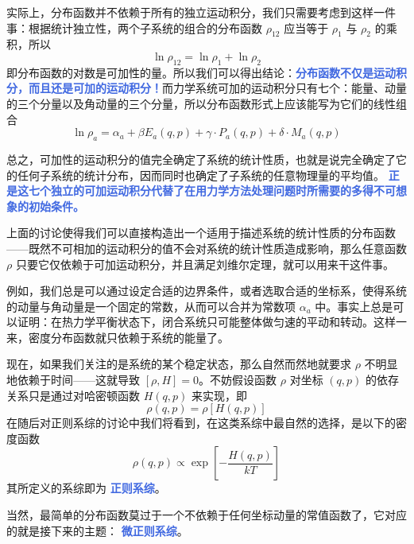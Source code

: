 实际上，分布函数并不依赖于所有的独立运动积分，我们只需要考虑到这样一件事：根据统计独立性，两个子系统的组合的分布函数 $\rho_{12}$ 应当等于 $\rho_1$ 与 $\rho_2$ 的乘积，所以
\begin{equation}\label{equ:jiahe}
    \ln\rho_{12} = \ln \rho_1 + \ln \rho_2
\end{equation}
即分布函数的对数是可加性的量。所以我们可以得出结论：\textcolor{RoyalBlue}{\textbf{\kaishu 分布函数不仅是运动积分，而且还是可加的运动积分！}}而力学系统可加的运动积分只有七个：能量、动量的三个分量以及角动量的三个分量，所以分布函数形式上应该能写为它们的线性组合
\begin{equation}\label{equ:linearcombination}
    \ln \rho_a = \alpha_a + \beta E_a(q,p) + \gamma \cdot P_a(q,p) + \delta \cdot M_a (q,p)
\end{equation}

总之，可加性的运动积分的值完全确定了系统的统计性质，也就是说完全确定了它的任何子系统的统计分布，因而同时也确定了子系统的任意物理量的平均值。 \textcolor{RoyalBlue}{\textbf{\kaishu 正是这七个独立的可加运动积分代替了在用力学方法处理问题时所需要的多得不可想象的初始条件。}}

上面的讨论使得我们可以直接构造出一个适用于描述系统的统计性质的分布函数——既然不可相加的运动积分的值不会对系统的统计性质造成影响，那么任意函数 $\rho$ 只要它仅依赖于可加运动积分，并且满足刘维尔定理，就可以用来干这件事。

例如，我们总是可以通过设定合适的边界条件，或者选取合适的坐标系，使得系统的动量与角动量是一个固定的常数，从而可以合并为常数项 $\alpha_a$ 中。事实上总是可以证明：在热力学平衡状态下，闭合系统只可能整体做匀速的平动和转动。这样一来，密度分布函数就只依赖于系统的能量了。

现在，如果我们关注的是系统的某个稳定状态，那么自然而然地就要求 $\rho$ 不明显地依赖于时间——这就导致 $[\rho, H] = 0$。不妨假设函数 $\rho$ 对坐标 $(q,p)$ 的依存关系只是通过对哈密顿函数 $H(q,p)$ 来实现，即
\begin{equation}
    \rho(q,p) = \rho[H(q,p)]
\end{equation} 
在随后对正则系综的讨论中我们将看到，在这类系综中最自然的选择，是以下的密度函数
\begin{equation}
    \rho(q, p) \propto \exp \left[-\frac{H(q, p)}{k T}\right]
\end{equation}
其所定义的系综即为 \textcolor{RoyalBlue}{\textbf{\kaishu 正则系综}}。

当然，最简单的分布函数莫过于一个不依赖于任何坐标动量的常值函数了，它对应的就是接下来的主题： \textcolor{RoyalBlue}{\textbf{\kaishu 微正则系综}}。



